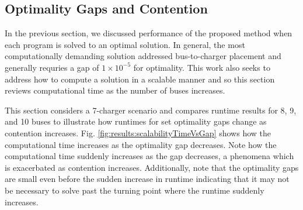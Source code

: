 \subsection{Optimality Gaps and Contention}
In the previous section, we discussed performance of the proposed method when each program is solved to an optimal solution. In general, the most computationally demanding solution addressed bus-to-charger placement and generally requries a gap of $1\times10^{-5}$ for optimality. This work also seeks to address how to compute a solution in a scalable manner and so this section reviews computational time as the number of buses increases.  
\par This section considers a 7-charger scenario and compares runtime results for 8, 9, and 10 buses to illustrate how runtimes for set optimality gaps change as contention increases. Fig. \ref{fig:results:scalabilityTimeVsGap} shows how the computational time increases as the optimality gap decreases. Note how the computational time suddenly increases as the gap decreases, a phenomena which is exacerbated as contention increases. Additionally, note that the optimality gaps are small even before the sudden increase in runtime indicating that it may not be necessary to solve past the turning point where the runtime suddenly increases. 
 

